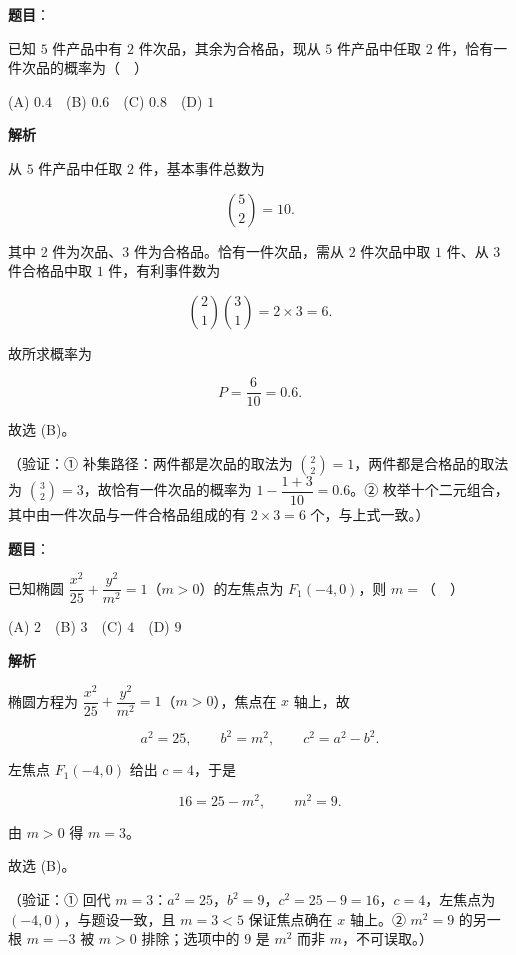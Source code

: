 \begin{answer}

\textbf{题目}：

已知 \(5\) 件产品中有 \(2\) 件次品，其余为合格品，现从 \(5\) 件产品中任取 \(2\) 件，恰有一件次品的概率为（　）

(A) \(0.4\)　(B) \(0.6\)　(C) \(0.8\)　(D) \(1\)

\textbf{解析}

从 \(5\) 件产品中任取 \(2\) 件，基本事件总数为

\nopagebreak[4]
\[
\binom{5}{2}=10.
\]

其中 \(2\) 件为次品、\(3\) 件为合格品。恰有一件次品，需从 \(2\) 件次品中取 \(1\) 件、从 \(3\) 件合格品中取 \(1\) 件，有利事件数为

\nopagebreak[4]
\[
\binom{2}{1}\binom{3}{1}=2\times 3=6.
\]

故所求概率为

\nopagebreak[4]
\[
P=\dfrac{6}{10}=0.6.
\]

故选 (B)。

（验证：① 补集路径：两件都是次品的取法为 \(\binom{2}{2}=1\)，两件都是合格品的取法为 \(\binom{3}{2}=3\)，故恰有一件次品的概率为 \(1-\dfrac{1+3}{10}=0.6\)。② 枚举十个二元组合，其中由一件次品与一件合格品组成的有 \(2\times 3=6\) 个，与上式一致。）


\end{answer}
\begin{answer}

\textbf{题目}：

已知椭圆 \(\dfrac{x^2}{25}+\dfrac{y^2}{m^2}=1\)（\(m>0\)）的左焦点为 \(F_1(-4,0)\)，则 \(m=\)（　）

\par\vspace*{3pt}

(A) \(2\)　(B) \(3\)　(C) \(4\)　(D) \(9\)

\textbf{解析}

椭圆方程为 \(\dfrac{x^2}{25}+\dfrac{y^2}{m^2}=1\)（\(m>0\)），焦点在 \(x\) 轴上，故

\nopagebreak[4]
\[
a^2=25,\qquad b^2=m^2,\qquad c^2=a^2-b^2.
\]

左焦点 \(F_1(-4,0)\) 给出 \(c=4\)，于是

\nopagebreak[4]
\[
16=25-m^2,\qquad m^2=9.
\]

由 \(m>0\) 得 \(m=3\)。

故选 (B)。

（验证：① 回代 \(m=3\)：\(a^2=25\)，\(b^2=9\)，\(c^2=25-9=16\)，\(c=4\)，左焦点为 \((-4,0)\)，与题设一致，且 \(m=3<5\) 保证焦点确在 \(x\) 轴上。② \(m^2=9\) 的另一根 \(m=-3\) 被 \(m>0\) 排除；选项中的 \(9\) 是 \(m^2\) 而非 \(m\)，不可误取。）


\end{answer}
